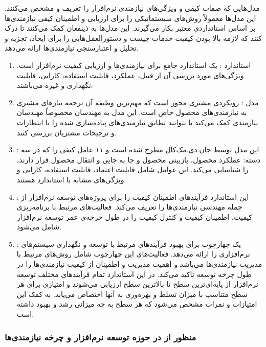 مدل‌هایی که صفات کیفی و ویژگی‌های نیازمندی نرم‌افزار را تعریف و مشخص می‌کنند.
این مدل‌ها معمولاً روش‌های سیستماتیکی را برای ارزیابی و اطمینان کیفی نیازمندی‌ها
بر اساس استانداردی معتبر بکار می‌گیرند. این مدل‌ها به ذینفعان کمک می‌کنند تا درک
کنند که لازمه بالا بودن کیفیت خدمات چیست و دستورالعمل‌هایی را برای ایجاد، تجزیه
و تحلیل و اعتبارسنجی نیازمندی‌ها ارائه می‌دهد.

\begin{enumerate}
    \item استاندارد  \cite{square}: یک استاندارد جامع
    برای نیازمندی‌ها و ارزیابی کیفیت نرم‌افزار است. ویژگی‌های مورد بررسی آن از
    قبیل، عملکرد، قابلیت استفاده، کارایی، قابلیت نگهداری و غیره می‌باشند.
    \item مدل  \cite{qfd}: رویکردی مشتری
    محور است که مهم‌ترین وظیفه آن ترجمه نیاز‌های مشتری به نیازمندی‌های محصول خاص
    است. این مدل به مهندسان مخصوصاً مهندسان نیازمندی کمک می‌کند تا بتوانند تطابق
    نیازمندی‌های پیاده‌سازی شده را با انتظارات و ترجیحات مشتریان بررسی کنند.
    \item {} \cite{mccallQualityModel}: این مدل توسط
    جان.دی.مک‌کال مطرح شده است و ۱۱ عامل کیفی را که در سه دسته: عملکرد محصول،
    بازبینی محصول و جا به جایی و انتقال محصول قرار دارند، را شناسایی می‌کند. این
    عوامل شامل قابلیت اعتماد، قابلیت استفاده، کارایی و ویژگی‌های مشابه با
    استاندارد  هستند.
    \item {} \cite{ieeeSQAP}: این استاندارد فرآیند‌های
    اطمینان کیفیت را برای پروژه‌های توسعه نرم‌افزار از جمله مهندسی نیازمندی‌ها
    را تعریف می‌کند.  فعالیت‌های مرتبط با برنامه‌ریزی کیفیت، اطمینان کیفیت و
    کنترل کیفیت را در طول چرخه‌ی عمر توسعه نرم‌افزار شامل می‌شود.
    \item {} \cite{cmmi}: یک
    چهارچوب برای بهبود فرآیند‌های مرتبط با توسعه و نگهداری سیستم‌های نرم‌افزاری
    را ارائه می‌دهد. فعالیت‌های این چهارچوب شامل روش‌های مرتبط با مدیریت
    نیازمندی‌ها می‌باشد و اهمیت مدیریت و اطمینان از کیفیت نیازمندی‌ها را در طول
    چرخه توسعه تاکید می‌کند. در این استاندارد تمام فرآیند‌های مختلف توسعه
    نرم‌افزار از پایه‌ای‌ترین سطح تا بالاترین سطح ارزیابی می‌شوند و امتیازی برای
    هر سطح متناسب با میزان تسلط و بهره‌وری به آنها اختصاص می‌یابد. به کمک این
    امتیازات و نمرات مشخص می‌شود که هر سطح به چه میزانی رشد و بهبود داشته است.
\end{enumerate}

\subsubsection*{منظور از  در حوزه توسعه نرم‌افزار و چرخه
نیازمندی‌ها}

